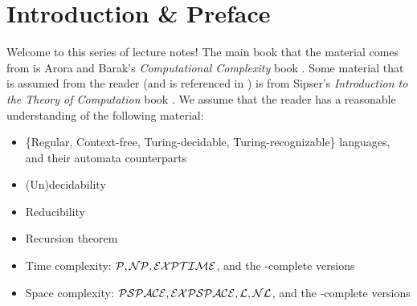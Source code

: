 \section{Introduction \& Preface}

Welcome to this series of lecture notes! The main book that the material comes from is Arora and Barak's \emph{Computational Complexity} book \cite{arora_baraz_computational_complexity}. Some material that is assumed from the reader (and is referenced in ) is from Sipser's \emph{Introduction to the Theory of Computation} book \cite{sipsertheoryofcomp}. We assume that the reader has a reasonable understanding of the following material:
\begin{itemize}
\item \{Regular, Context-free, Turing-decidable, Turing-recognizable\} languages, and their automata counterparts
\item (Un)decidability
\item Reducibility
\item Recursion theorem
\item Time complexity: $\mathcal{P}, \mathcal{NP}, \mathcal{EXPTIME}$, and the -complete versions
\item Space complexity: $\mathcal{PSPACE}, \mathcal{EXPSPACE}, \mathcal{L}, \mathcal{NL}$, and the -complete versions
\end{itemize}